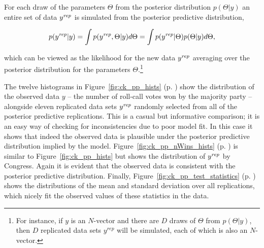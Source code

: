 For each draw of the parameters $\Theta$ from the posterior distribution $p(\Theta | y)$ an entire set of data $y^{\it rep} $ is simulated from the posterior predictive distribution,

\begin{equation*}
 p(y^{\it rep} | y) = \int p(y^{\it rep}, \Theta | y) d\Theta = \int p(y^{\it rep} | \Theta) p(\Theta | y) d\Theta,
\end{equation*}

\noindent which can be viewed as the likelihood for the new data $y^{\it rep}$ averaging over the posterior distribution for the parameters $\Theta$.\footnote{For instance, if $y$ is an $N$-vector and there are $D$ draws of $\Theta$ from $p(\Theta | y)$, then $D$ replicated data sets $y^{rep}$ will be simulated, each of which is also an $N$-vector.}

The twelve histograms in Figure~\ref{fig:ck_pp_hists} (p. \pageref{fig:ck_pp_hists}) show the distribution of the observed data $y$ -- the number of roll-call votes won by the majority party -- alongside eleven replicated data sets $y^{\it rep}$ randomly selected from all of the posterior predictive replications. This is a casual but informative comparison; it is an easy way of checking for inconsistencies due to poor model fit. In this case it shows that indeed the observed data is plausible under the posterior predictive distribution implied by the model. Figure~\ref{fig:ck_pp_nWins_hists} (p. \pageref{fig:ck_pp_nWins_hists}) is similar to Figure~\ref{fig:ck_pp_hists} but shows the distribution of $y^{\it rep}$ by Congress. Again it is evident that the observed data is consistent with the posterior predictive distribution. Finally, Figure~\ref{fig:ck_pp_test_statistics} (p. \pageref{fig:ck_pp_test_statistics}) shows the distributions of the mean and standard deviation over all replications, which nicely fit the observed values of these statistics in the data. 


